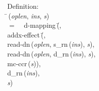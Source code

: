 \begin{tabbing}{\sc Definition}: \\  
\=\,({\it{oplen\/}}, {\it{ins\/}}, {\it{s\/}}) \\ 
$=$$\;\;\;\;${\rm{d-mapping}}\,(\=, \\ 
{\rm{addx-effect}}\,(\=, \\ 
{\rm{read-dn}}\,({\it{oplen\/}}, {\rm{s\_rn}}\,({\it{ins\/}}), {\it{s\/}}), \\ 
{\rm{read-dn}}\,({\it{oplen\/}}, {\rm{d\_rn}}\,({\it{ins\/}}), {\it{s\/}}), \\ 
{\rm{mc-ccr}}\,({\it{s\/}}))\-, \\ 
{\rm{d\_rn}}\,({\it{ins\/}}), \\ 
{\it{s\/}})\-\-
\end{tabbing}

